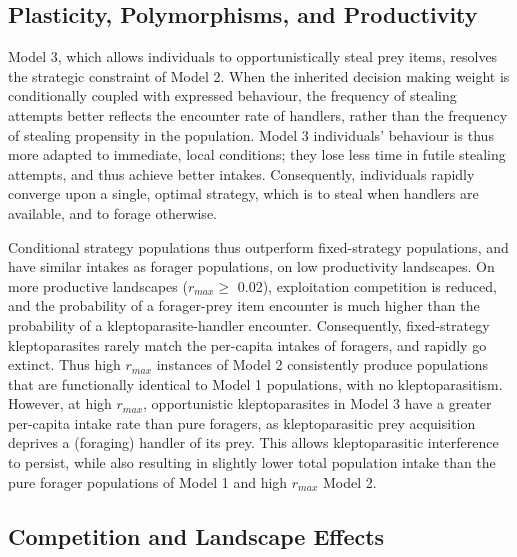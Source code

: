 \documentclass[11pt]{article}
\begin{document}
\subsection{Plasticity, Polymorphisms, and Productivity}

Model 3, which allows individuals to opportunistically steal prey items, resolves the strategic constraint of Model 2.
When the inherited decision making weight is conditionally coupled with expressed behaviour, the frequency of stealing attempts better reflects the encounter rate of handlers, rather than the frequency of stealing propensity in the population.
Model 3 individuals' behaviour is thus more adapted to immediate, local conditions; they lose less time in futile stealing attempts, and thus achieve better intakes.
Consequently, individuals rapidly converge upon a single, optimal strategy, which is to steal when handlers are available, and to forage otherwise.

Conditional strategy populations thus outperform fixed-strategy populations, and have similar intakes as forager populations, on low productivity landscapes.
On more productive landscapes ($r_{max} \geq$ 0.02), exploitation competition is reduced, and the probability of a forager-prey item encounter is much higher than the probability of a kleptoparasite-handler encounter.
Consequently, fixed-strategy kleptoparasites rarely match the per-capita intakes of foragers, and rapidly go extinct.
Thus high $r_{max}$ instances of Model 2 consistently produce populations that are functionally identical to Model 1 populations, with no kleptoparasitism.
However, at high $r_{max}$, opportunistic kleptoparasites in Model 3 have a greater per-capita intake rate than pure foragers, as kleptoparasitic prey acquisition deprives a (foraging) handler of its prey. 
This allows kleptoparasitic interference to persist, while also resulting in slightly lower total population intake than the pure forager populations of Model 1 and high $r_{max}$ Model 2.

\subsection{Competition and Landscape Effects}
\end{document}
